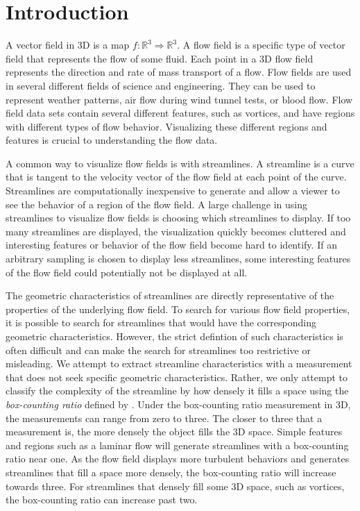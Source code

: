 \documentclass{egpubl}
\newcommand {\emath}[1]  {\ensuremath{#1}}
\newcommand {\Real}[1]   {\emath{\mathbb{R}^{#1}}}   %
\newcommand {\Rthree}    {\Real{3}}                  %
\begin{document}

\section{Introduction}

A vector field in 3D is a map $f: \Rthree \Rightarrow \Rthree$.
A flow field is a specific type of vector field that represents the flow of some fluid.
Each point in a 3D flow field represents the direction and rate of mass transport of a flow.
Flow fields are used in several different fields of science and engineering.
They can be used to represent weather patterns, air flow during wind tunnel tests, or blood flow.
Flow field data sets contain several different features, such as vortices, and have regions with different types of flow behavior.
Visualizing these different regions and features is crucial to understanding the flow data.

A common way to visualize flow fields is with streamlines.
A streamline is a curve that is tangent to the velocity vector of the flow field at each point of the curve.
Streamlines are computationally inexpensive to generate and allow a viewer to see the behavior of a region of the flow field.
A large challenge in using streamlines to visualize flow fields is choosing which streamlines to display.
If too many streamlines are displayed, the visualization quickly becomes cluttered and interesting features or behavior of the flow field become hard to identify.
If an arbitrary sampling is chosen to display less streamlines, some interesting features of the flow field could potentially not be displayed at all.

The geometric characteristics of streamlines are directly representative of the properties of the underlying flow field.
To search for various flow field properties, it is possible to search for streamlines that would have the corresponding geometric characteristics.
However, the strict defintion of such characteristics is often difficult and can make the search for streamlines too restrictive or misleading.
We attempt to extract streamline characteristics with a measurement that does not seek specific geometric characteristics.
Rather, we only attempt to classify the complexity of the streamline by how densely it fills a space using the \textit{box-counting ratio} defined by \cite{khoury}.
Under the box-counting ratio measurement in 3D, the measurements can range from zero to three.
The closer to three that a measurement is, the more densely the object fills the 3D space.
Simple features and regions such as a laminar flow will generate streamlines with a box-counting ratio near one.
As the flow field displays more turbulent behaviors and generates streamlines that fill a space more densely, the box-counting ratio will increase towards three.
For streamlines that densely fill some 3D space, such as vortices, the box-counting ratio can increase past two.
\end{document}

